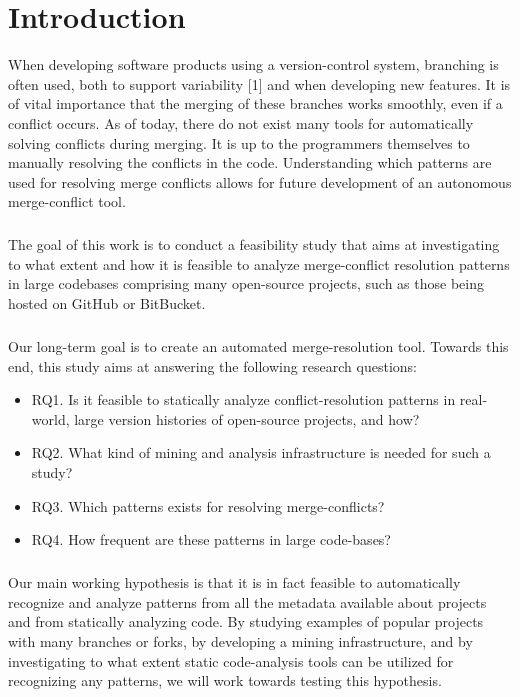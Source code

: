 \chapter{Introduction}
When developing software products using a version-control system, branching is often used, both to support variability [1] and when developing new features. It is of vital importance that the merging of these branches works smoothly, even if a conflict occurs. As of today, there do not exist many tools for automatically solving conflicts during merging. It is up to the programmers themselves to manually resolving the conflicts in the code. Understanding which patterns are used for resolving merge conflicts allows for future development of an autonomous merge-conflict tool.
\paragraph*{}
The goal of this work is to conduct a feasibility study that aims at investigating to what extent and how it is feasible to analyze merge-conflict resolution patterns in large codebases comprising many open-source projects, such as those being hosted on GitHub or BitBucket.
\paragraph*{}
Our long-term goal is to create an automated merge-resolution tool. Towards this end, this study aims at answering the following research questions:
\begin{itemize}
\item RQ1. Is it feasible to statically analyze conflict-resolution patterns in real-world, large version histories of open-source projects, and how?
\item RQ2. What kind of mining and analysis infrastructure is needed for such a study?
\item RQ3. Which patterns exists for resolving merge-conflicts?
\item RQ4. How frequent are these patterns in large code-bases?
\end{itemize}
\paragraph*{}
Our main working hypothesis is that it is in fact feasible to automatically recognize and analyze patterns from all the metadata available about projects and from statically analyzing code. By studying examples of popular projects with many branches or forks, by developing a mining infrastructure, and by investigating to what extent static code-analysis tools can be utilized for recognizing any patterns, we will work towards testing this hypothesis.